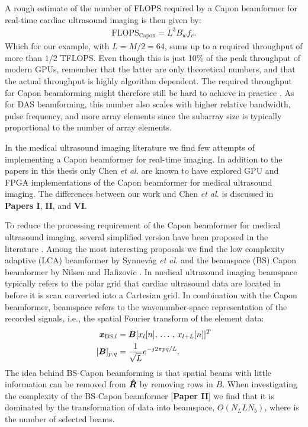 A rough estimate of the number of FLOPS required by a Capon beamformer for real-time cardiac ultrasound imaging is then given by:
\begin{align}
\text{FLOPS}_{\text{Capon}} = L^3B_wf_c.
\end{align}
Which for our example, with $L=M/2=64$, sums up to a required throughput of more than $1/2$ TFLOPS. Even though this is just 10\% of the peak throughput of modern GPUs, remember that the latter are only theoretical numbers, and that the actual throughput is highly algorithm dependent. The required throughput for Capon beamforming might therefore still be hard to achieve in practice \cite[\textbf{Paper II}]{So2011}. As for DAS beamforming, this number also scales with higher relative bandwidth, pulse frequency, and more array elements since the subarray size is typically proportional to the number of array elements. 

In the medical ultrasound imaging literature we find few attempts of implementing a Capon beamformer for real-time imaging. In addition to the papers in this thesis only Chen \textit{et al.} \cite{Chen2011, Chen, Chen2011a} are known to have explored GPU and FPGA implementations of the Capon beamformer for medical ultrasound imaging. The differences between our work and Chen \textit{et al.} is discussed in \textbf{Papers I}, \textbf{II}, and \textbf{VI}.

To reduce the processing requirement of the Capon beamformer for medical ultrasound imaging, several simplified version have been proposed in the literature \cite{Asl2012, Kim}. Among the most interesting proposals we find the low complexity adaptive (LCA) beamformer by Synnev\aa{}g \textit{et al.} \cite{Synnevag2011} and the beamspace (BS) Capon beamformer by Nilsen and Hafizovic \cite{Nilsen2009}. In medical ultrasound imaging beamspace typically refers to the polar grid that cardiac ultrasound data are located in before it is scan converted into a Cartesian grid. In combination with the Capon beamformer, beamspace refers to the wavenumber-space representation of the recorded signals, i.e., the spatial Fourier transform of the element data: 
\begin{align}
\vec{x}_{\text{BS},l} &= \mat{B}[x_l[n],\,\dotso,\,x_{l+L}[n]]^T\\
[\mat{B}]_{p,q} &= \frac{1}{\sqrt{L}}e^{-j 2 \pi p q / L}.
\end{align}
The idea behind BS-Capon beamforming is that spatial beams with little information can be removed from $\boldsymbol{\hat{R}}$ by removing rows in $B$. When investigating the complexity of the BS-Capon beamformer [\textbf{Paper II}] we find that it is dominated by the transformation of data into beamspace, $O(N_LLN_b)$, where  is the number of selected beams. 

